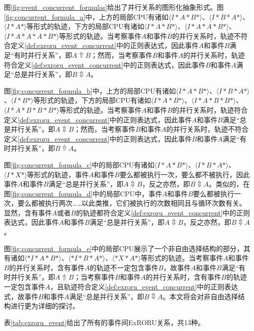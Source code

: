 图\ref{fig:event_concurrent_formulas}给出了并行关系的图形化抽象形式。图\ref{fig:concurrent_formula_a}中，上方的局部CPU有诸如$\langle I*A*B*\rangle$、$\langle I*B*A*\rangle$、$\langle I*A*\rangle$等形式的轨迹，下方的局部CPU有诸如$\langle I*A*B*\rangle$、$\langle I*A*A*B*\rangle$、$\langle I*A*A*A*B*\rangle$等形式的轨迹。当考察事件$A$和事件$B$的并行关系时，轨迹不符合定义\ref{def:exroru_event_concurrent}中的正则表达式，因此事件$A$和事件$B$满足“有时并行关系”，即$A\Uparrow B$；然而，当考察事件$B$和事件$A$的并行关系时，轨迹符合定义\ref{def:exroru_event_concurrent}中的正则表达式，因此事件$B$和事件$A$满足“总是并行关系”，即$B\Updownarrow A$。

图\ref{fig:concurrent_formula_b}中，上方的局部CPU有诸如$\langle I*A*B*\rangle$、$\langle I*B*A*\rangle$、$\langle I*B*\rangle$等形式的轨迹，下方的局部CPU有诸如$\langle I*A*B*\rangle$、$\langle I*A*B*B*\rangle$、$\langle I*A*B*B*B*\rangle$等形式的轨迹。当考察事件$A$和事件$B$的并行关系时，轨迹符合定义\ref{def:exroru_event_concurrent}中的正则表达式，因此事件$A$和事件$B$满足“总是并行关系”，即$A\Updownarrow B$；然而，当考察事件$B$和事件$A$的并行关系时，轨迹不符合定义\ref{def:exroru_event_concurrent}中的正则表达式，因此事件$B$和事件$A$满足“有时并行关系”，即$B\Uparrow A$。

图\ref{fig:concurrent_formula_c}中的局部CPU有诸如$\langle I*A*B*\rangle$、$\langle I*B*A*\rangle$、$\langle I*X*\rangle$等形式的轨迹，事件$A$和事件$B$要么都被执行一次，要么都不被执行，因此事件$A$和事件$B$满足“总是并行关系”，即$A\Updownarrow B$，反之亦然，即$B\Updownarrow A$。类似的，在图\ref{fig:concurrent_formula_d}中的局部CPU中，事件$A$和事件$B$要么都被执行一次，要么都被执行两次……以此类推，它们被执行的次数相同且与循环次数有关。显然，含有事件$A$或者$B$的轨迹都符合定义\ref{def:exroru_event_concurrent}中的正则表达式，因此事件$A$和事件$B$满足“总是并行关系”，即$A\Updownarrow B$，反之亦然，即$B\Updownarrow A$。

图\ref{fig:concurrent_formula_e}中的局部CPU展示了一个非自由选择结构的部分，其有诸如$\langle *I*A*B*\rangle$、$\langle *I*B*A*\rangle$、$\langle *X*A*\rangle$等形式的轨迹。当考察事件$A$和事件$B$的并行关系时，含有事件$A$的轨迹不一定包含事件$B$，故事件$A$和事件$B$满足“有时并行关系”，即$A\Uparrow B$；当考察事件$B$和事件$A$的并行关系时，含有事件$B$的轨迹一定包含事件$A$，且轨迹符合定义\ref{def:exroru_event_concurrent}中的正则表达式，故事件$B$和事件$A$满足“总是并行关系”，即$B\Updownarrow A$。本文将会对非自由选择结构进行更为详细的探讨。

表\ref{tab:exroru_event}给出了所有的事件间ExRORU关系，共13种。

